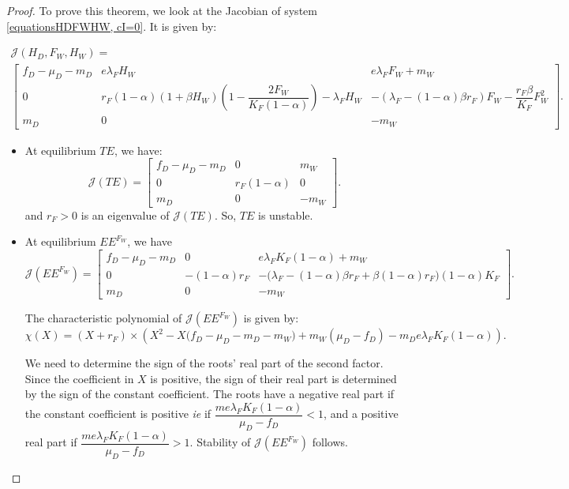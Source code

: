 \documentclass{article}
\newcommand{\lfw}{\lambda_{F}}
\newcommand{\lfw}{\lambda_{F}}
\begin{document}
\begin{proof}
To prove this theorem, we look at the Jacobian of system \eqref{equationsHDFWHW, cI=0}. It is given by:

\begin{multline*}
\mathcal{J}(H_D, F_W, H_W) = \\
\begin{bmatrix}
f_D-\mu_D - m_D & e \lfw H_W & e\lfw F_W + m_W \\
0 & r_F(1-\alpha)(1+\beta H_W) \left( 1 - \dfrac{2F_W}{K_F(1-\alpha)} \right) - \lfw H_W & - (\lfw - (1-\alpha)\beta r_F) F_W -  \dfrac{r_F\beta}{K_F} F_W^2\\
m_D & 0 & -m_W
\end{bmatrix}.
\end{multline*}

\begin{itemize}
\item At equilibrium $TE$, we have:
\begin{equation*}
\mathcal{J}(TE) = \begin{bmatrix}
f_D-\mu_D - m_D & 0 &  m_W \\
0 & r_F(1-\alpha)  &  0\\
m_D & 0 & -m_W
\end{bmatrix}.
\end{equation*}
and $r_F > 0$ is an eigenvalue of $\mathcal{J}(TE)$. So, $TE$ is unstable.
\item At equilibrium $EE^{F_W}$, we have
\begin{equation*}
\mathcal{J}(EE^{F_W}) = \begin{bmatrix}
f_D-\mu_D - m_D & 0 & e\lfw K_F(1-\alpha) + m_W \\
0 & -(1-\alpha)r_F  & -\Big(\lfw - (1-\alpha)\beta r_F + \beta (1-\alpha)r_F \Big)(1-\alpha)K_F  \\
m_D & 0 & -m_W
\end{bmatrix}.
\end{equation*}

The characteristic polynomial of $\mathcal{J}(EE^{F_W})$ is given by:
\begin{equation*}
\chi(X) = (X +r_F) \times \left(X^2 - X\Big(f_D - \mu_D - m_D - m_W \Big) + m_W(\mu_D - f_D) - m_D e \lfw K_F(1-\alpha) \right).
\end{equation*}

We need to determine the sign of the roots' real part of the second factor. Since the coefficient in $X$ is positive, the sign of their real part is determined by the sign of the constant coefficient.
The roots have a negative real part if the constant coefficient is positive \textit{ie} if $\dfrac{m e \lfw K_F(1-\alpha)}{\mu_D - f_D} < 1 $, and a positive real part if $\dfrac{m e \lfw K_F(1-\alpha)}{\mu_D - f_D} > 1 $. Stability of $\mathcal{J}(EE^{F_W})$ follows.


\end{itemize}
\end{proof}
\end{document}

